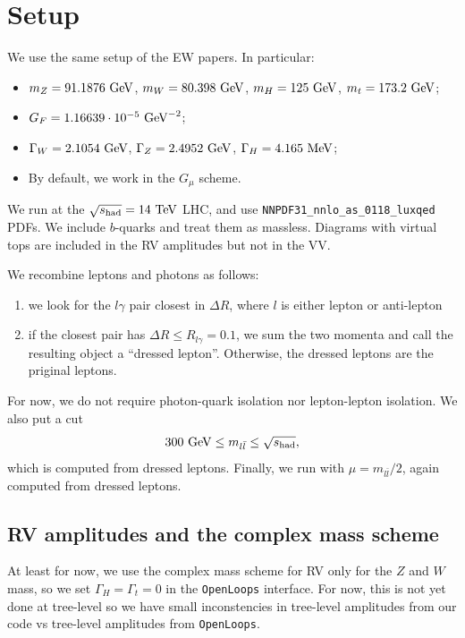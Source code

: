 \documentclass[a4paper]{article}
\begin{document}
\section{Setup}
We use the same setup of the EW papers. In particular:
\begin{itemize}
\item $m_Z = 91.1876~{\rm GeV}$, $m_W = 80.398~{\rm GeV}$, $m_H =
  125~{\rm GeV}$, $m_t = 173.2~{\rm GeV}$; 
\item $G_F = 1.16639\cdot 10^{-5}~{\rm GeV}^{-2}$;
\item $\Gamma_W = 2.1054~{\rm GeV}$, $\Gamma_Z = 2.4952~{\rm GeV}$, $\Gamma_H = 4.165~\rm{MeV}$;
\item  By default, we work in the $G_{\mu}$ scheme. 
\end{itemize}
We run at the $\sqrt{s_{\rm had}} = 14~{\rm TeV}$ LHC, and use
\texttt{NNPDF31\_nnlo\_as\_0118\_luxqed} PDFs.
We include $b$-quarks and treat them as massless. Diagrams with virtual tops are
included in the RV amplitudes but not in the VV.

\noindent
We recombine leptons
and photons as follows:
\begin{enumerate}
\item we look for the $l\gamma$ pair closest in $\Delta R$, where $l$
  is either lepton or anti-lepton
\item if the closest pair has $\Delta R \le R_{l\gamma} = 0.1$, we sum the
  two momenta and call the resulting object a ``dressed lepton''. Otherwise,
  the dressed leptons are the priginal leptons.
\end{enumerate}
For now, we do not require photon-quark isolation nor lepton-lepton isolation.
We also put a cut
\begin{equation}
  300~{\rm GeV} \le m_{l\bar l} \le \sqrt{s_{\rm had}},
\end{equation}
which is computed from dressed leptons. Finally, we run with $\mu = m_{l\bar l}/2$, again
computed from dressed leptons. 

\subsection{RV amplitudes and the complex mass scheme}
At least for now, we use
the complex mass scheme for RV only for the $Z$ and $W$ mass, so we set
$\Gamma_H=\Gamma_t=0$ in the \texttt{OpenLoops} interface. For now, this
is not yet done at tree-level so we have small inconstencies in tree-level
amplitudes from our code vs tree-level amplitudes from \texttt{OpenLoops}.
\end{document}
